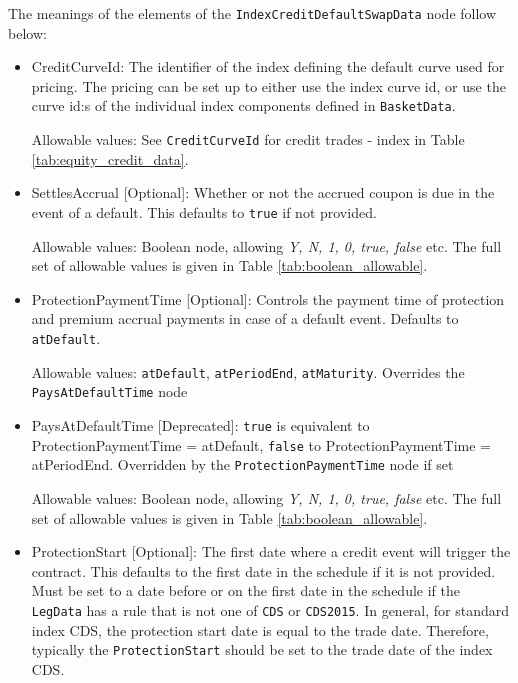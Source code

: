 The meanings of the elements of the {\tt IndexCreditDefaultSwapData}  node follow below:

\begin{itemize}
\item CreditCurveId: The identifier of the index defining the default curve used for pricing. The pricing can be set up to either use the index curve id, or use the curve id:s of the individual index components defined in {\tt BasketData}.

Allowable values: See \lstinline!CreditCurveId! for credit trades - index in Table \ref{tab:equity_credit_data}. \\

\item SettlesAccrual [Optional]: Whether or not the accrued coupon is due in the event of a default. This defaults to \lstinline!true! if not provided.

Allowable values: Boolean node, allowing \emph{Y, N, 1, 0, true, false} etc. The full set of allowable values is given in Table \ref{tab:boolean_allowable}.

\item ProtectionPaymentTime [Optional]: Controls the payment time of protection and premium accrual payments in case of
  a default event. Defaults to \lstinline!atDefault!. 
  
  Allowable values: \lstinline!atDefault!, \lstinline!atPeriodEnd!, \lstinline!atMaturity!. Overrides the \lstinline!PaysAtDefaultTime! node

\item PaysAtDefaultTime [Deprecated]: \lstinline!true! is equivalent to ProtectionPaymentTime = atDefault,
  \lstinline!false! to ProtectionPaymentTime = atPeriodEnd. Overridden by the \lstinline!ProtectionPaymentTime! node if set
  
Allowable values: Boolean node, allowing \emph{Y, N, 1, 0, true, false} etc. The full set of allowable values is given in Table \ref{tab:boolean_allowable}.

\item ProtectionStart [Optional]: The first date where a credit event will trigger the contract. This defaults to the first date in the schedule if it is not provided. Must be set to a date before or on the first date in the schedule if the \lstinline!LegData! has a rule that is not one of \lstinline!CDS! or \lstinline!CDS2015!. In general, for standard index CDS, the protection start date is equal to the trade date. Therefore, typically the \lstinline!ProtectionStart! should be set to the trade date of the index CDS.


\end{itemize}

